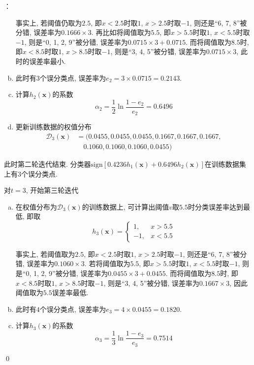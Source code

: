 \documentclass[a4paper,UTF8]{ctexart}
\theoremstyle{plain} \newtheorem{theorem}{定理}[section]
\theoremstyle{plain} \newtheorem{definition}{定义}[section]
\theoremstyle{plain} \newtheorem{lemma}{引理}[section]
\theoremstyle{plain} \newtheorem{proposition}{命题}[section]
\theoremstyle{plain} \newtheorem{example}{例}[section]
\theoremstyle{plain} \newtheorem{remark}{注}[section]
\theoremstyle{plain} \newtheorem{corollary}{推论}[section]
\newenvironment{mysolution}{{\color{blue} 解}： }{{\color{magenta}\qed}}
\begin{document}
\begin{mysolution}
\begin{enumerate}[(a)]
事实上, 若阈值仍取为$2.5$, 即$x < 2.5$时取$1$, $x > 2.5$时取$-1$, 则还是“6, 7, 8”被分错, 误差率为$0.1666 \times 3$. 再比如将阈值取为$5.5$, 即$x > 5.5$时取$1$, $x < 5.5$时取$-1$, 则是“0, 1, 2, 9”被分错, 误差率为$0.0715 \times 3 + 0.0715$. 而将阈值取为$8.5$时, 即$x < 8.5$时取$1$, $x > 8.5$时取$-1$, 则是“3, 4, 5”被分错, 误差率为$0.0715 \times 3$, 此时的误差率最小. 

\item 此时有$3$个误分类点, 误差率为$e_{2} = 3 \times 0.0715 = 0.2143$. 

\item 计算$h_{2}(\bm{x})$的系数
\begin{equation*}
\alpha_{2} = \frac{1}{2} \ln \frac{1 - e_2}{e_2} = 0.6496
\end{equation*}

\item 更新训练数据的权值分布
\begin{align*}
\mathcal{D}_{3}(\bm{x}) & = (0.0455, 0.0455, 0.0455, 0.1667, 0.1667, 0.1667, \\ 
& \quad 0.1060, 0.1060, 0.1060, 0.0455)
\end{align*}

\end{enumerate}

此时第二轮迭代结束. 分类器$\mathrm{sign}[0.4236 h_{1}(\bm{x}) + 0.6496 h_{2}(\bm{x})]$在训练数据集上有$3$个误分类点.

{\color{red}对$t = 3$, 开始第三轮迭代}
\begin{enumerate}[(a)]
\item 在权值分布为$\mathcal{D}_{3}(\bm{x})$的训练数据上, 可计算出阈值$v$取$5.5$时分类误差率达到最低, 即取
$$
h_{3}(\bm{x}) = 
\begin{cases}
1, & x > 5.5 \\ 
-1, & x < 5.5
\end{cases}
$$

事实上, 若阈值取为$2.5$, 即$x < 2.5$时取$1$, $x > 2.5$时取$-1$, 则还是“6, 7, 8”被分错, 误差率为$0.1060 \times 3$. 若将阈值取为$5.5$, 即$x > 5.5$时取$1$, $x < 5.5$时取$-1$, 则是“0, 1, 2, 9”被分错, 误差率为$0.0455 \times 3 + 0.0455$. 而将阈值取为$8.5$时, 即$x < 8.5$时取$1$, $x > 8.5$时取$-1$, 则是“3, 4, 5”被分错, 误差率为$0.1667 \times 3$, 因此阈值取为$5.5$误差率最低.

\item 此时有$4$个误分类点, 误差率为$e_{3} = 4 \times 0.0455 = 0.1820$. 

\item 计算$h_{3}(\bm{x})$的系数
\begin{equation*}
\alpha_{3} = \frac{1}{3} \ln \frac{1 - e_3}{e_3} = 0.7514
\end{equation*}


\end{enumerate}
\end{mysolution}
\end{document}
